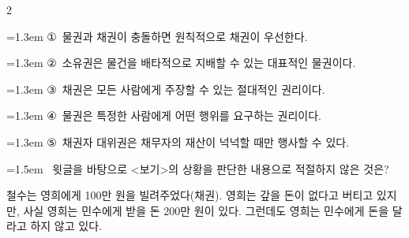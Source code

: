 \documentclass[10pt, a4paper]{article}
\begin{document}
\begin{multicols}{2}
\begin{minipage}{\columnwidth}
\vspace{0.5mm}
{\hangindent=1.3em  \noindent\hspace{0.3em}①~물권과 채권이 충돌하면 원칙적으로 채권이 우선한다.\par}
{\hangindent=1.3em  \noindent\hspace{0.3em}②~소유권은 물건을 배타적으로 지배할 수 있는 대표적인 물권이다.\par}
{\hangindent=1.3em  \noindent\hspace{0.3em}③~채권은 모든 사람에게 주장할 수 있는 절대적인 권리이다.\par}
{\hangindent=1.3em  \noindent\hspace{0.3em}④~물권은 특정한 사람에게 어떤 행위를 요구하는 권리이다.\par}
{\hangindent=1.3em  \noindent\hspace{0.3em}⑤~채권자 대위권은 채무자의 재산이 넉넉할 때만 행사할 수 있다.\par}
\vspace{4mm}
\end{minipage}
\par

\noindent\begin{minipage}{\columnwidth}
\vspace{2mm}
{\hangindent=1.5em  ~윗글을 바탕으로 <보기>의 상황을 판단한 내용으로 적절하지 않은 것은?\par}

\vspace{1mm}
\begin{boxibox}
철수는 영희에게 100만 원을 빌려주었다(채권). 영희는 갚을 돈이 없다고 버티고 있지만, 사실 영희는 민수에게 받을 돈 200만 원이 있다. 그런데도 영희는 민수에게 돈을 달라고 하지 않고 있다. \\
\end{boxibox}
\vspace{1mm}


\end{minipage}
\end{multicols}
\end{document}
